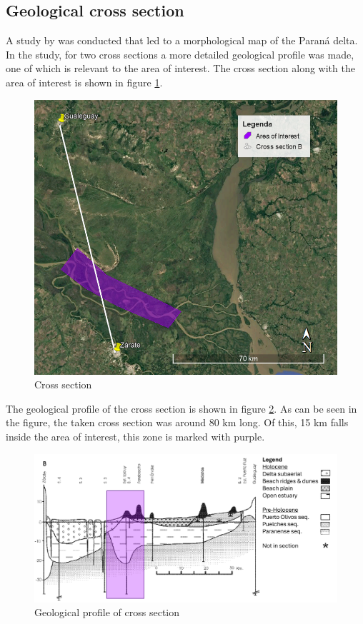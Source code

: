 \subsection{Geological cross section}
A study by \citeauthor{joseluiscavallottoEvolucionCambiosAmbientales2005} was conducted that led to a morphological map of the Paraná delta. In the study, for two cross sections a more detailed geological profile was made, one of which is relevant to the area of interest. The cross section along with the area of interest is shown in figure \ref{fig:crosssectiongeo}.

\begin{figure}[H]
    \centering
    \includegraphics[width=0.75\linewidth]{figures/ch9/CrossSectionB.png}
    \caption{Cross section}
    \label{fig:crosssectiongeo}
\end{figure}

The geological profile of the cross section is shown in figure \ref{fig:geolprofile}. As can be seen in the figure, the taken cross section was around 80 km long. Of this, 15 km falls inside the area of interest, this zone is marked with purple.

\begin{figure}[H]
    \centering
    \includegraphics[width=1\linewidth]{figures/ch9/CrossSectionBResults.png}
    \caption{Geological profile of cross section \autocite{joseluiscavallottoEvolucionCambiosAmbientales2005}}
    \label{fig:geolprofile}
\end{figure}

